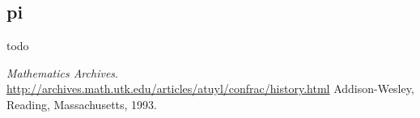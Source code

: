 \documentclass[a4paper]{article}
\begin{document}
    \subsection{pi}
    todo

    \begin{thebibliography}{9}
        \textit{Mathematics Archives}.
        \\
        \url{http://archives.math.utk.edu/articles/atuyl/confrac/history.html}
        Addison-Wesley, Reading, Massachusetts, 1993.

    \end{thebibliography}
\end{document}
